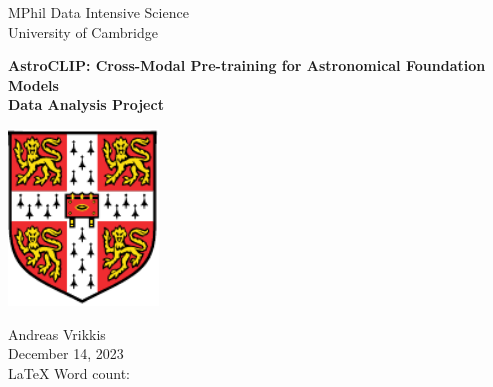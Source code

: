 \documentclass[draft, a4paper,12pt]{article}
\begin{document}
    
    \vspace*{3cm}
    
    \begin{center}
     {\Large MPhil Data Intensive Science}  \\ [3pt]
     {\Large University of Cambridge}  \\ [3pt]
     
     \vspace*{1cm}
     \hrulefill
     \vspace*{0.75cm}
     
     {\LARGE \textbf{AstroCLIP: Cross-Modal Pre-training for Astronomical Foundation Models}} \\ [6pt]
     \large \textbf{Data Analysis Project} \\ [6pt]
     \vspace*{0.05cm}
     \hrulefill
     \vspace*{1.5cm}

    \includegraphics[width=0.3\textwidth]{../figures/University_Crest.pdf} 

    \vspace*{1.5cm}
     
     {\Large  Andreas Vrikkis} \\ [6pt]
     {\large  December 14, 2023} \\ [3pt]
     {\large  \LaTeX \hspace{0.03cm} Word count:  } \\ [3pt]
     
     \end{center}   
    
    
    \newpage
    
    \restoregeometry
    
\end{document}
